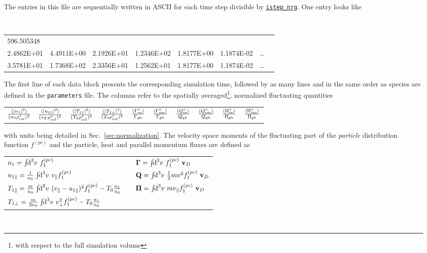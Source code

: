 \documentclass[12pt]{article}
\begin{document}
The entries in this file are sequentially written in ASCII for each time step divisible by 
\hyperlink{istep_nrg}{\tt istep\_nrg}. One entry looks like
\begin{center}
\scriptsize \tt
\begin{tabular}{llllllll}
596.505348 & & & & & & &\\
2.4862E+01 & 4.4911E+00 & 2.1926E+01 & 1.2346E+02 & 1.8177E+00 & 1.1874E-02 & \ldots \\ %
3.5781E+01 & 1.7368E+02 & 2.3356E+01 & 1.2562E+01 & 1.8177E+00 & 1.1874E-02 & \ldots %
\end{tabular}
\end{center}
The first line of each data block presents the corresponding simulation time, 
followed by as many lines and in the same order as species are defined in
the {\tt parameters} file. The columns refer to the spatially averaged\footnote{with respect to the full simulation
volume}, normalized fluctuating quantities\\[-5ex]
\begin{center}
\begin{tabular}{*{10}{c}} %
$\frac{\langle \left| n_1 \right|^2 \rangle}{(n_0\rho_{{\rm ref}}^*)^2}$ & $\frac{\langle |u_{1\parallel}|^2 \rangle}{(v_T \rho_{\rm ref}^*)^2}$ & 
$\frac{{\langle |T_{1\parallel}|^2 \rangle}}{(T_0 \rho_{\rm ref}^*)^2}$ & $\frac{{\langle \left| T_{1\perp} \right|^2 \rangle}}{(T_0 \rho_{\rm ref}^*)^2}$ & 
$\frac{\langle \Gamma_{\rm es}^x \rangle}{\Gamma_{\rm gb}}$ & $\frac{\langle \Gamma_{\rm em}^x \rangle}{\Gamma_{\rm gb}}$ &
$\frac{\langle Q_{\rm es}^x \rangle}{Q_{\rm gb}}$ & $\frac{\langle Q_{\rm em}^x \rangle}{Q_{\rm gb}}$ &
$\frac{\langle \Pi_{\rm es}^x \rangle}{\Pi_{\rm gb}}$ & $\frac{\langle \Pi_{\rm em}^x \rangle}{\Pi_{\rm gb}}$ \\
\end{tabular}
\end{center}
with units being detailed in Sec.~\ref{sec:normalization}. 
The velocity space moments of the fluctuating part of the {\em particle} distribution function $f^{(pc)}$ and the 
particle, heat and parallel momentum fluxes are defined as\\[1ex]
\begin{tabular}{lp{3em}l}
$n_{1} = \int\!\!\text{d}^3v\,\, f_1^{(pc)}$                     & & $\mathbf{\Gamma} = \int\!\!\text{d}^3v\,\, f_1^{(pc)}\,\, \mathbf{v}_D$ \\
$u_{1\|} = \frac{1}{n_0} \int\!\!\text{d}^3v\,\,v_\| f_1^{(pc)}$ & & $\mathbf{Q} = \int\!\!\text{d}^3v\,\, \frac{1}{2}m v^2 f_1^{(pc)}\,\, \mathbf{v}_D$ \\
$T_{1\|} = \frac{m}{n_{0}} \int\!\!\text{d}^3v\,\,(v_\|-u_{1\|})^2 f_1^{(pc)} - T_{0} \frac{n_{1}}{n_{0}}$ & & 
$\mathbf{\Pi} = \int\!\!\text{d}^3v\,\, m v_{\|} f_1^{(pc)}\,\, \mathbf{v}_D$ \\
$T_{1\perp} = \frac{m}{2n_{0}} \int\!\!\text{d}^3v\,\,v_\perp^2 f_1^{(pc)} - T_{0} \frac{n_{1}}{n_0}$ & \\
\end{tabular}\\[1ex]
\end{document}
